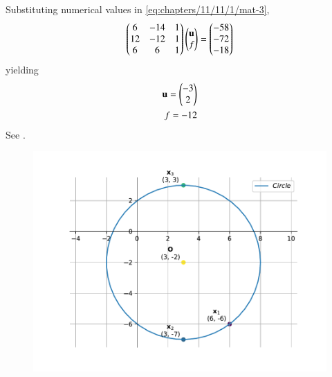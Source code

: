 Substituting numerical values in 
	\eqref{eq:chapters/11/11/1/mat-3},
\begin{align}
 \begin{pmatrix}6 & -14 & 1 \\
	12 & -12 & 1 \\
	6 & 6 & 1
	\end{pmatrix} \begin{pmatrix}\mathbf{u} \\
	           f 
		\end{pmatrix}  = \begin{pmatrix}-58 \\ -72 \\ -18 \end{pmatrix}
\end{align}
yielding
\begin{align}
	\mathbf{u} = \begin{pmatrix}-3 \\ 2\end{pmatrix} \\ 
	f = -12 
\end{align}
See .
\begin{figure}[H]
	\begin{center}
		\includegraphics[width=0.75\columnwidth]{chapters/10/7/4/3/figs/fig.pdf}
	\end{center}
\caption{}
\label{fig:10/7/4/3Fig1}
\end{figure}
